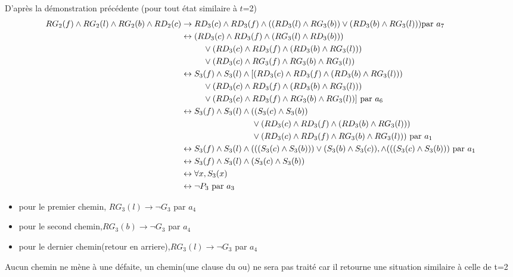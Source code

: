 \documentclass{article}
\begin{document}
D'après la démonstration précédente (pour tout état similaire à $t$=2)\\
\begin{align*}
    RG_2(f) \wedge RG_2(l) \wedge RG_2(b) \wedge RD_2(c)& \to RD_3(c) \wedge RD_3(f) \wedge ((RD_3(l)\wedge RG_3(b))\vee (RD_3(b)\wedge RG_3(l))) \text {par } a_7\\
    & \leftrightarrow (RD_3(c)\wedge RD_3(f)\wedge (RG_3(l)\wedge RD_3(b)))\\
    & \hphantom{aaaaa}\vee (RD_3(c)\wedge RD_3(f)\wedge (RD_3(b)\wedge RG_3(l)))\\
    & \hphantom{aaaaa}\vee (RD_3(c) \wedge RG_3(f) \wedge RG_3(b) \wedge RG_3(l))\\
    & \leftrightarrow S_3(f) \wedge S_3(l) \wedge [(RD_3(c)\wedge RD_3(f)\wedge (RD_3(b)\wedge RG_3(l)))  \\
    & \hphantom{aaaaa} \vee (RD_3(c)\wedge RD_3(f)\wedge (RD_3(b)\wedge RG_3(l)))\\
    & \hphantom{aaaaa}\vee (RD_3(c) \wedge RD_3(f) \wedge RG_3(b) \wedge RG_3(l))]\text{ par }a_6\\
    & \leftrightarrow S_3(f) \wedge S_3(l) \wedge ((S_3(c)\wedge S_3(b))\\
    &\hphantom{aaaaaaaaaaaaaaaa}\vee (RD_3(c)\wedge RD_3(f)\wedge (RD_3(b)\wedge RG_3(l)))\\
    &\hphantom{aaaaaaaaaaaaaaaa}\vee (RD_3(c) \wedge RD_3(f) \wedge RG_3(b) \wedge RG_3(l)))\text{ par } a_1\\
    &\leftrightarrow S_3(f) \wedge S_3(l) \wedge (((S_3(c)\wedge S_3(b))) \vee (S_3(b)\wedge S_3(c)),\wedge (((S_3(c)\wedge S_3(b)))\text{ par } a_1\\
    &\leftrightarrow S_3(f) \wedge S_3(l) \wedge (S_3(c)\wedge S_3(b))\\
    & \leftrightarrow \forall x, S_3(x)\\
    & \leftrightarrow \neg P_3 \text{ par } a_3
\end{align*}

\begin{itemize}
  \item pour le premier chemin, $RG_3(l) \to \neg G_3$ par $a_4$
  \item pour le second chemin,$RG_3(b) \to \neg G_3$ par $a_4$
  \item pour le dernier chemin(retour en arriere),$RG_3(l) \to \neg G_3$ par $a_4$
\end{itemize}
Aucun chemin ne mène à une défaite, un chemin(une clause du ou) ne sera pas traité car il retourne une situation similaire à celle de t=2
\end{document}
